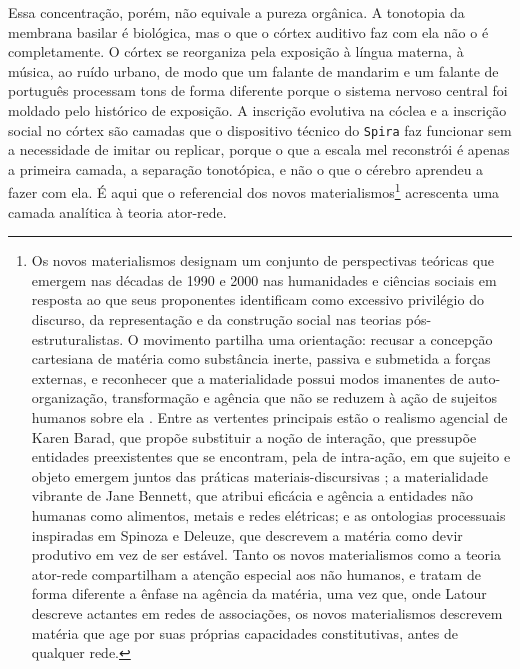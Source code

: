 Essa concentração, porém, não equivale a pureza orgânica. A tonotopia da membrana basilar é biológica, mas o que o córtex auditivo faz com ela não o é completamente. O córtex se reorganiza pela exposição à língua materna, à música, ao ruído urbano, de modo que um falante de mandarim e um falante de português processam tons de forma diferente porque o sistema nervoso central foi moldado pelo histórico de exposição. A inscrição evolutiva na cóclea e a inscrição social no córtex são camadas que o dispositivo técnico do \texttt{Spira} faz funcionar sem a necessidade de imitar ou replicar, porque o que a escala mel reconstrói é apenas a primeira camada, a separação tonotópica, e não o que o cérebro aprendeu a fazer com ela. É aqui que o referencial dos novos materialismos\footnote{Os novos materialismos designam um conjunto de perspectivas teóricas que emergem nas décadas de 1990 e 2000 nas humanidades e ciências sociais em resposta ao que seus proponentes identificam como excessivo privilégio do discurso, da representação e da construção social nas teorias pós-estruturalistas. O movimento partilha uma orientação: recusar a concepção cartesiana de matéria como substância inerte, passiva e submetida a forças externas, e reconhecer que a materialidade possui modos imanentes de auto-organização, transformação e agência que não se reduzem à ação de sujeitos humanos sobre ela \parencite[pp.~7--10]{CooleFrost2010}. Entre as vertentes principais estão o realismo agencial de Karen Barad, que propõe substituir a noção de interação, que pressupõe entidades preexistentes que se encontram, pela de intra-ação, em que sujeito e objeto emergem juntos das práticas materiais-discursivas \parencite{Barad2007Meeting}; a materialidade vibrante de Jane Bennett, que atribui eficácia e agência a entidades não humanas como alimentos, metais e redes elétricas; e as ontologias processuais inspiradas em Spinoza e Deleuze, que descrevem a matéria como devir produtivo em vez de ser estável. Tanto os novos materialismos como a teoria ator-rede compartilham a atenção especial aos não humanos, e tratam de forma diferente a ênfase na agência da matéria, uma vez que, onde Latour descreve actantes em redes de associações, os novos materialismos descrevem matéria que age por suas próprias capacidades constitutivas, antes de qualquer rede.} acrescenta uma camada analítica à teoria ator-rede.

